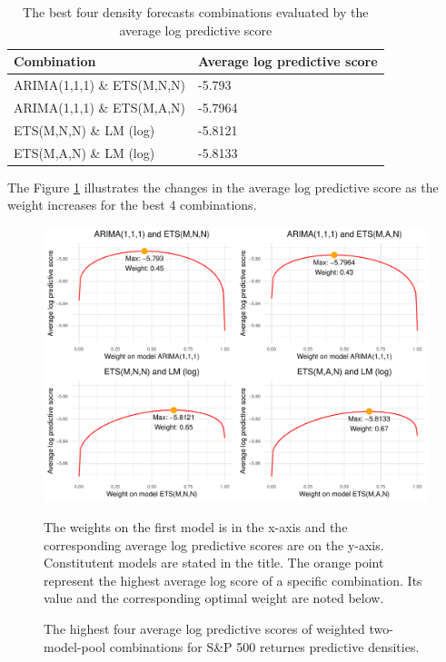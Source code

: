 \documentclass{monashthesis}
\begin{document}
\begin{table}[htbp!]
  \centering
  \caption{The best four density forecasts combinations evaluated by the average log predictive score}
    \begin{tabular}{ll}
    \toprule
    Combination & Average log predictive score \\
    \midrule
    ARIMA(1,1,1) \& ETS(M,N,N) & -5.793 \\
    ARIMA(1,1,1) \& ETS(M,A,N) & -5.7964 \\
    ETS(M,N,N) \&  LM (log) & -5.8121 \\
    ETS(M,A,N) \&  LM (log) & -5.8133 \\
    \bottomrule
    \end{tabular}
  \label{tab:3}
\end{table}

\vspace{0.3cm}

The Figure \ref{fig:best4} illustrates the changes in the average log predictive score as the weight increases for the best 4 combinations.

\vspace{0.3cm}

\begin{figure}[htbp!]
\centering
\caption{The highest four average log predictive scores of weighted two-model-pool combinations for S\&P 500 returnes predictive densities. }
\includegraphics{figures/best4.pdf}
\begin{flushleft}
{\footnotesize The weights on the first model is in the x-axis and the corresponding average log predictive scores are on the y-axis. Constitutent models are stated in the title. The orange point represent the highest average log score of a specific combination. Its value and the corresponding optimal weight are noted below.}\\
\end{flushleft}
\label{fig:best4}
\end{figure}
\end{document}

